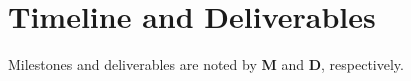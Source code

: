 \documentclass[letterpaper, 11pt]{article}
\newcommand{\milestone}{\textbf{\textrm{M}}}
\newcommand{\deliverable}{\textbf{\textrm{D}}}
\begin{document}
\section{Timeline and Deliverables}



Milestones and deliverables are noted by \milestone{} and \deliverable{}, respectively.
\end{document}
